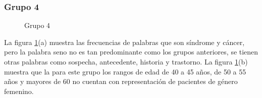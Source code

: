 
\subsubsection*{Grupo 4}

\begin{figure}[h!]
	\centering
	\caption{Grupo 4} \label{fig:c4}
\end{figure}

La figura \ref{fig:c4}(a) muestra las frecuencias de palabras que son síndrome y cáncer, pero la palabra seno no es tan predominante como los grupos anteriores, se tienen otras palabras como sospecha, antecedente, historia y trastorno. La figura \ref{fig:c4}(b) muestra que la para este grupo los rangos de edad de 40 a 45 años, de 50 a 55 años y mayores de 60 no cuentan con representación de pacientes de género femenino.


